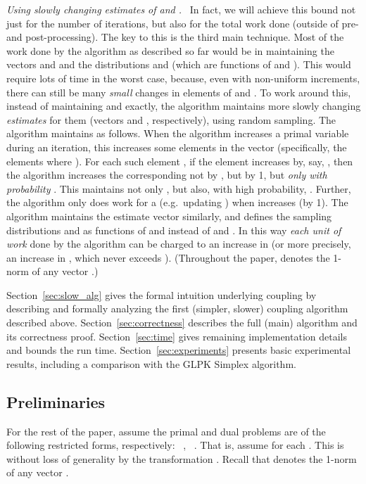 \documentclass[11pt]{svjour3} \usepackage{fullpage}
\renewcommand{\paragraph}[1]{\smallskip\vspace{2pt}\par{\em #1}~}
\begin{document}
\paragraph{Using slowly changing estimates of  and .}
In fact, we will achieve this bound not just for the number of iterations, 
but also for the total work done (outside of pre- and post-processing).
The key to this is the third main technique.
Most of the work done by the algorithm as described so far
would be in maintaining the vectors  and 
and the distributions  and  (which are functions of  and ).
This would require lots of time in the worst case, because, even with non-uniform increments, there can still be many {\em small} changes in elements of  and .
To work around this, instead of maintaining  and  exactly,
the algorithm maintains more slowly changing {\em estimates} for them (vectors  and , respectively), using random sampling.
The algorithm maintains  as follows.
When the algorithm increases a primal variable  during an iteration,
this increases some elements in the vector 
(specifically, the elements  where ).
For each such element , if the element increases by, say, ,
then the algorithm increases the corresponding  not by , but by 1, but {\em only with probability }.
This maintains not only , but also, with high probability, .
Further, the algorithm only does work for a  (e.g.~updating )
when  increases (by 1).
The algorithm maintains the estimate vector  similarly,
and defines the sampling distributions  and  as functions 
of  and  instead of  and .
In this way {\em each unit of work}  done by the algorithm
can be charged to an increase in  
(or more precisely, an increase in , which never exceeds ).
(Throughout the paper,  denotes the 1-norm of any vector .)

Section~\ref{sec:slow_alg} gives the formal intuition underlying coupling by describing and formally analyzing the first (simpler, slower) coupling algorithm described above.
Section~\ref{sec:correctness} describes the full (main) algorithm and its correctness proof.
Section~\ref{sec:time} gives remaining implementation details and bounds the run time.  
Section~\ref{sec:experiments} presents basic experimental results, including a comparison with the GLPK Simplex algorithm.

\subsection{Preliminaries}
For the rest of the paper, 
assume the primal and dual problems are of the following restricted forms, respectively:
~,
~.
That is, assume  for each .
This is without loss of generality by the transformation .
Recall that  denotes the 1-norm of any vector .
\end{document}
